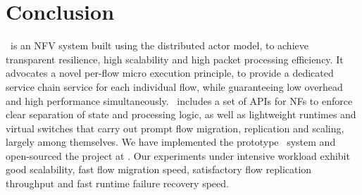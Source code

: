 \section{Conclusion}
\label{sec:conclusion}

\nfactor~is an NFV system built using the distributed actor model, to achieve transparent resilience, high scalability and high packet processing efficiency. It advocates a novel per-flow micro execution principle, to provide a dedicated service chain service for each individual flow, while guaranteeing low overhead and high performance simultaneously. \nfactor~includes a set of APIs for NFs to enforce clear separation of state and processing logic, as well as lightweight runtimes and virtual switches that carry out prompt flow migration, replication and scaling, largely among themselves. We have implemented the prototype \nfactor~system and open-sourced the project at \cite{projectcode}. Our experiments under intensive workload exhibit good scalability, fast flow migration speed, satisfactory flow replication throughput and fast runtime failure recovery speed. %
